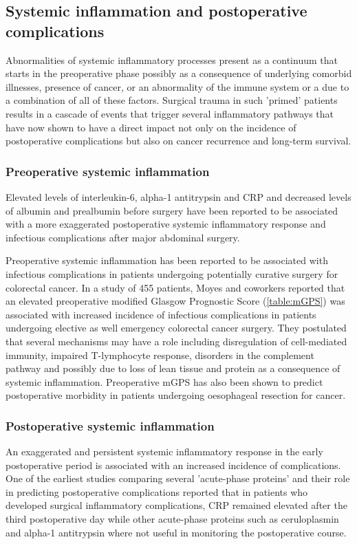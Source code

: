 \subsection{Systemic inflammation and postoperative complications}

Abnormalities of systemic inflammatory processes present as a continuum that starts in the preoperative phase possibly as a consequence of underlying comorbid illnesses, presence of cancer, or an abnormality of the immune system or a due to a combination of all of these factors. Surgical trauma in such 'primed' patients results in a cascade of events that trigger several inflammatory pathways that have now shown to have a direct impact not only on the incidence of postoperative complications but also on cancer recurrence and long-term survival.

\subsubsection{Preoperative systemic inflammation}
Elevated levels of interleukin-6, alpha-1 antitrypsin and CRP and decreased levels of albumin and prealbumin before surgery have been reported to be associated with a more exaggerated postoperative systemic inflammatory response and infectious complications after major abdominal surgery.\parencite{haupt_association_1997}

Preoperative systemic inflammation has been reported to be associated with infectious complications in patients undergoing potentially curative surgery for colorectal cancer.\parencite{moyes_preoperative_2009} In a study of 455 patients, Moyes and coworkers reported that an elevated preoperative modified Glasgow Prognostic Score (\ref{table:mGPS}) was associated with increased incidence of infectious complications in patients undergoing elective as well emergency colorectal cancer surgery. They postulated that several mechanisms may have a role including disregulation of cell-mediated immunity, impaired T-lymphocyte response, disorders in the complement pathway and possibly due to loss of lean tissue and protein as a consequence of systemic inflammation. Preoperative mGPS has also been shown to predict postoperative morbidity in patients undergoing oesophageal resection for cancer.\parencite{vashist_glasgow_2010} 

\subsubsection{Postoperative systemic inflammation}
An exaggerated and persistent systemic inflammatory response in the early postoperative period is associated with an increased incidence of complications. One of the earliest studies comparing several 'acute-phase proteins' and their role in predicting postoperative complications reported that in patients who developed surgical inflammatory complications, CRP remained elevated after the third postoperative day while other acute-phase proteins such as ceruloplasmin and alpha-1 antitrypsin where not useful in monitoring the postoperative course.\parencite{fischer_quantitation_1976} 

